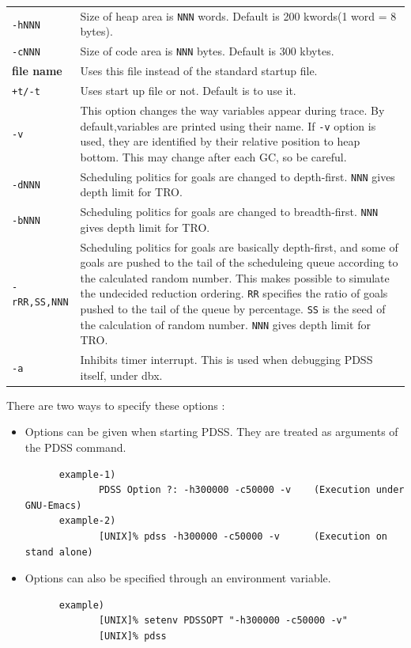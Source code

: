 \hspace*{15mm}\begin{tabular}{l@{ :: }p{120mm}}
\verb|-hNNN| &
Size of heap area is \verb|NNN| words.
				Default is 200 kwords(1 word = 8 bytes).\\
\verb|-cNNN| &
Size of code area is \verb|NNN| bytes. Default is 300 kbytes.\\
{\bf file name} &
Uses this file instead of the standard startup file.\\
\verb|+t/-t| &
Uses start up file or not. Default is to use it.\\
\verb|-v| &	This option changes the way variables appear during trace.
		By default,variables are printed using their name.
		If \verb|-v| option is used, they are identified
		by their relative position to heap bottom.
		This may change after each GC, so be careful.\\
\verb|-dNNN| & Scheduling politics for goals are changed to depth-first.
		\verb|NNN| gives depth limit for TRO.\\
\verb|-bNNN| & Scheduling politics for goals are changed to breadth-first.
		\verb|NNN| gives depth limit for TRO.\\
\verb|-rRR,SS,NNN| & Scheduling politics for goals are basically depth-first,
		and some of goals are pushed to the tail of the scheduleing
		queue according to the calculated random number.
		This makes possible to simulate the undecided
		reduction ordering. \verb|RR| specifies the ratio of goals
		pushed to the tail of the queue by percentage. \verb|SS| is the
		seed of the calculation of random number.
		\verb|NNN| gives depth limit for TRO.\\
\verb|-a| &
Inhibits timer interrupt. This is used when debugging PDSS itself, under dbx.\\
\end{tabular}
\vspace{1ex}

There are two ways to specify these options  :
\begin{itemize}
\item Options can be given when starting PDSS. They are treated as arguments
of the PDSS command.
\begin{verbatim}
      example-1)
             PDSS Option ?: -h300000 -c50000 -v    (Execution under GNU-Emacs)
      example-2)
             [UNIX]% pdss -h300000 -c50000 -v      (Execution on stand alone)
\end{verbatim}
\item Options can also be specified through an environment variable.
\begin{verbatim}
      example)
             [UNIX]% setenv PDSSOPT "-h300000 -c50000 -v"
             [UNIX]% pdss
\end{verbatim}
\end{itemize}

